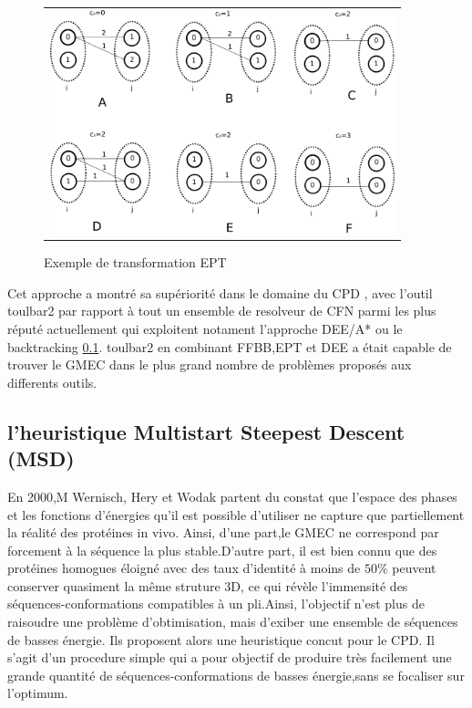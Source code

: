 \begin{figure}[t]
  \centering
  \begin{tabular}{c}
    \includegraphics[width=10cm]{figure/coherences_local.png} \\
  \end{tabular}
  \caption{Exemple de transformation EPT}
  \label{EPT}
\end{figure}




Cet approche a montré sa supériorité dans le domaine du CPD , avec l'outil toulbar2 par rapport à tout un ensemble de resolveur de CFN parmi les plus réputé actuellement qui exploitent notament l'approche DEE/A* ou le backtracking \ref{}. toulbar2 en combinant FFBB,EPT et DEE a était capable de trouver le GMEC dans le plus grand nombre de problèmes proposés aux differents outils.

\subsection{l'heuristique Multistart Steepest Descent (MSD)}

En 2000,M Wernisch, Hery et Wodak partent du constat que l'espace des phases et les fonctions d'énergies qu'il est possible d'utiliser ne capture que partiellement la réalité des protéines in vivo. Ainsi, d'une part,le GMEC ne correspond par forcement à la séquence la plus stable.D'autre part, il est bien connu que des protéines homogues éloigné avec des taux d'identité à moins de $50\%$ peuvent conserver quasiment la même struture 3D, ce qui révèle l'immensité des séquences-conformations compatibles à un pli.Ainsi, l'objectif n'est plus de raisoudre une problème d'obtimisation, mais d'exiber une ensemble de séquences de basses énergie. Ils proposent alors une heuristique concut pour le CPD. Il s'agit d'un procedure simple qui a pour objectif de produire très facilement une grande quantité de séquences-conformations de basses énergie,sans se focaliser sur l'optimum.

